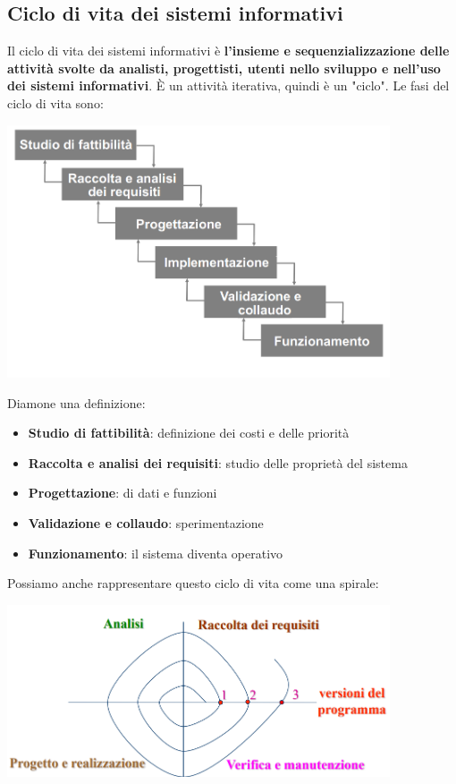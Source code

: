 \documentclass[12pt]{article}
\begin{document}
\subsection{Ciclo di vita dei sistemi informativi}
Il ciclo di vita dei sistemi informativi è \textbf{l'insieme e sequenzializzazione delle attività svolte da analisti, progettisti, utenti nello sviluppo e nell'uso dei sistemi informativi}.
È un attività iterativa, quindi è un "ciclo".
\newpage
\noindent
Le fasi del ciclo di vita sono:
\begin{center}
    \includegraphics[width = 0.85\textwidth]{Images/11.PNG}
\end{center}
Diamone una definizione:
\begin{itemize}
    \item \textbf{Studio di fattibilità}: definizione dei costi e delle priorità
    \item \textbf{Raccolta e analisi dei requisiti}: studio delle proprietà del sistema
    \item \textbf{Progettazione}: di dati e funzioni
    \item \textbf{Validazione e collaudo}: sperimentazione
    \item \textbf{Funzionamento}: il sistema diventa operativo
\end{itemize}
Possiamo anche rappresentare questo ciclo di vita come una spirale:
\begin{center}
    \includegraphics[width = 0.85\textwidth]{Images/12.PNG}
\end{center}
\end{document}

